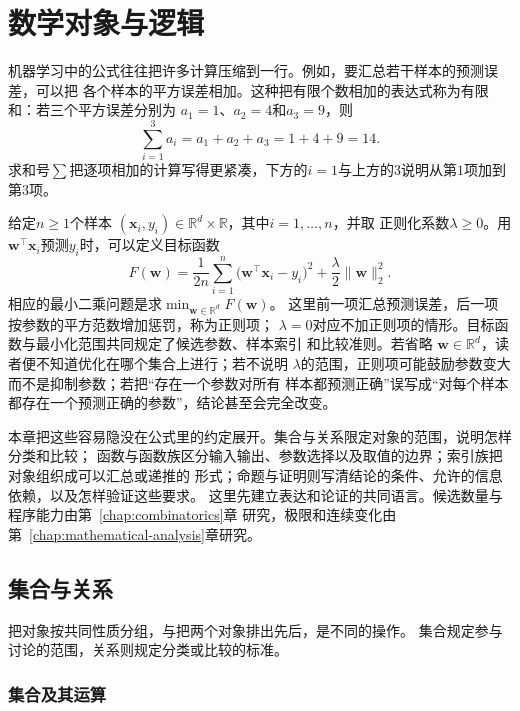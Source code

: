 \chapter{数学对象与逻辑}
\label{chap:sets-functions-and-proofs}

机器学习中的公式往往把许多计算压缩到一行。例如，要汇总若干样本的预测误差，可以把
各个样本的平方误差相加。这种把有限个数相加的表达式称为有限和：若三个平方误差分别为
$a_1=1$、$a_2=4$和$a_3=9$，则
\[
  \sum_{i=1}^{3}a_i=a_1+a_2+a_3=1+4+9=14.
\]
求和号$\sum$把逐项相加的计算写得更紧凑，下方的$i=1$与上方的$3$说明从第$1$项加到
第$3$项。

给定$n\geq1$个样本
$(\bm{x}_i,y_i)\in\mathbb{R}^d\times\mathbb{R}$，其中$i=1,\ldots,n$，并取
正则化系数$\lambda\geq0$。用$\bm{w}^{\top}\bm{x}_i$预测$y_i$时，可以定义目标函数
\begin{equation}
  F(\bm{w})
  =
  \frac{1}{2n}\sum_{i=1}^{n}
  \bigl(\bm{w}^{\top}\bm{x}_i-y_i\bigr)^2
  +
  \frac{\lambda}{2}\lVert\bm{w}\rVert_2^2.
  \label{eq:prelim-regularized-least-squares}
\end{equation}
相应的最小二乘问题是求$\min_{\bm{w}\in\mathbb{R}^d}F(\bm{w})$。
这里前一项汇总预测误差，后一项按参数的平方范数增加惩罚，称为正则项；
$\lambda=0$对应不加正则项的情形。目标函数与最小化范围共同规定了候选参数、样本索引
和比较准则。若省略
$\bm{w}\in\mathbb{R}^d$，读者便不知道优化在哪个集合上进行；若不说明
$\lambda$的范围，正则项可能鼓励参数变大而不是抑制参数；若把“存在一个参数对所有
样本都预测正确”误写成“对每个样本都存在一个预测正确的参数”，结论甚至会完全改变。

本章把这些容易隐没在公式里的约定展开。集合与关系限定对象的范围，说明怎样分类和比较；
函数与函数族区分输入输出、参数选择以及取值的边界；索引族把对象组织成可以汇总或递推的
形式；命题与证明则写清结论的条件、允许的信息依赖，以及怎样验证这些要求。
这里先建立表达和论证的共同语言。候选数量与程序能力由第~\ref{chap:combinatorics}章
研究，极限和连续变化由第~\ref{chap:mathematical-analysis}章研究。

\section{集合与关系}
\label{sec:prelim-sets-relations-functions}

把对象按共同性质分组，与把两个对象排出先后，是不同的操作。
集合规定参与讨论的范围，关系则规定分类或比较的标准。

\subsection{集合及其运算}
\label{sec:prelim-set-operations}


